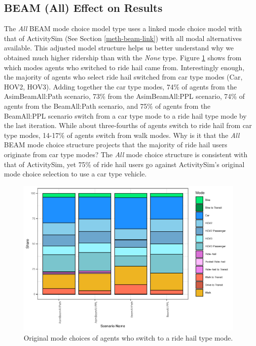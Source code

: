 \documentclass[12pt, oneside, openright]{byuthesis}
\begin{document}
\hypertarget{type3}{%
\subsection{BEAM (All) Effect on Results}\label{type3}}

The \emph{All} BEAM mode choice model type uses a linked mode choice model with that of ActivitySim (See Section \ref{meth-beam-link}) with all modal alternatives available. This adjusted model structure helps us better understand why we obtained much higher ridership than with the \emph{None} type. Figure \ref{fig:piechart} shows from which modes agents who switched to ride hail came from. Interestingly enough, the majority of agents who select ride hail switched from car type modes (Car, HOV2, HOV3). Adding together the car type modes, 74\% of agents from the AsimBeamAll:Path scenario, 73\% from the AsimBeamAll:PPL scenario, 74\% of agents from the BeamAll:Path scenario, and 75\% of agents from the BeamAll:PPL scenario switch from a car type mode to a ride hail type mode by the last iteration. While about three-fourths of agents switch to ride hail from car type modes, 14-17\% of agents switch from walk modes. Why is it that the \emph{All} BEAM mode choice structure projects that the majority of ride hail users originate from car type modes? The \emph{All} mode choice structure is consistent with that of ActivitySim, yet 75\% of ride hail users go against ActivitySim's original mode choice selection to use a car type vehicle.

\begin{figure}

{\centering \includegraphics{thesis_files/figure-latex/piechart-1} 

}

\caption{Original mode choices of agents who switch to a ride hail type mode.}\label{fig:piechart}
\end{figure}
\end{document}
